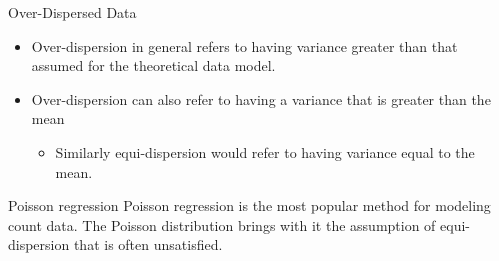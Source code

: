 \documentclass[
  ignorenonframetext,
]{beamer}
\providecommand{\tightlist}{%
  \setlength{\itemsep}{0pt}\setlength{\parskip}{0pt}}\usepackage{longtable,booktabs,array}
\begin{document}
\begin{frame}{Over-Dispersed Data}
\protect\hypertarget{over-dispersed-data}{}
\begin{itemize}
\tightlist
\item
  Over-dispersion in general refers to having variance greater than that
  assumed for the theoretical data model.\\
\item
  Over-dispersion can also refer to having a variance that is greater
  than the mean

  \begin{itemize}
  \tightlist
  \item
    Similarly equi-dispersion would refer to having variance equal to
    the mean.
  \end{itemize}
\end{itemize}

\begin{alertblock}{Poisson regression}
\protect\hypertarget{poisson-regression}{}
Poisson regression is the most popular method for modeling count data.
The Poisson distribution brings with it the assumption of
equi-dispersion that is often unsatisfied.
\end{alertblock}
\end{frame}
\end{document}
